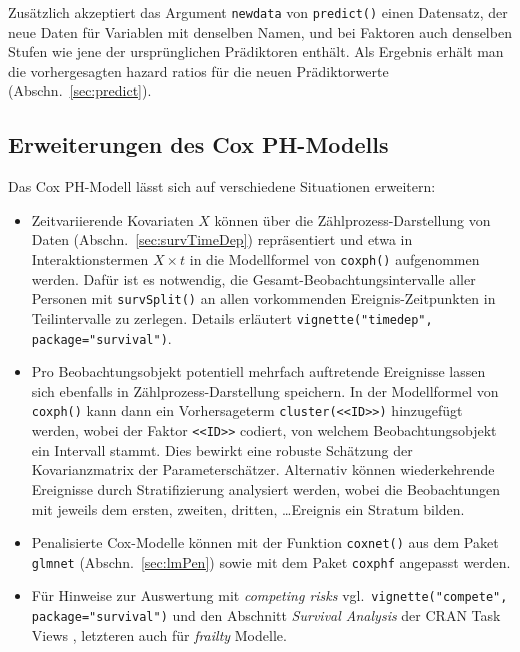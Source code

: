 Zusätzlich akzeptiert das Argument \lstinline!newdata! von \lstinline!predict()! einen Datensatz, der neue Daten für Variablen mit denselben Namen, und bei Faktoren auch denselben Stufen wie jene der ursprünglichen Prädiktoren enthält. Als Ergebnis erhält man die vorhergesagten hazard ratios für die neuen Prädiktorwerte (Abschn.\ \ref{sec:predict}).

\subsection{Erweiterungen des Cox PH-Modells}
\label{sec:coxExtend}

Das Cox PH-Modell lässt sich auf verschiedene Situationen erweitern:

\begin{itemize}
\item Zeitvariierende Kovariaten $X$ können über die Zählprozess-Darstellung von Daten (Abschn.\ \ref{sec:survTimeDep}) repräsentiert und etwa in Interaktionstermen $X \times t$ in die Modellformel von \lstinline!coxph()! aufgenommen werden. Dafür ist es notwendig, die Gesamt-Beobachtungsintervalle aller Personen mit \lstinline!survSplit()! an allen vorkommenden Ereignis-Zeitpunkten in Teilintervalle zu zerlegen. Details erläutert \lstinline!vignette("timedep", package="survival")!.
\item Pro Beobachtungsobjekt potentiell mehrfach auftretende Ereignisse lassen sich ebenfalls in Zählprozess-Darstellung speichern. In der Modellformel von \lstinline!coxph()! kann dann ein Vorhersageterm \lstinline!cluster(<<ID>>)! hinzugefügt werden, wobei der Faktor \lstinline!<<ID>>! codiert, von welchem Beobachtungsobjekt ein Intervall stammt. Dies bewirkt eine robuste Schätzung der Kovarianzmatrix der Parameterschätzer. Alternativ können wiederkehrende Ereignisse durch Stratifizierung analysiert werden, wobei die Beobachtungen mit jeweils dem ersten, zweiten, dritten, \ldots Ereignis ein Stratum bilden.
\item Penalisierte Cox-Modelle können mit der Funktion \lstinline!coxnet()! aus dem Paket \lstinline!glmnet! (Abschn.\ \ref{sec:lmPen}) sowie mit dem Paket  \lstinline!coxphf! \cite{Ploner2013} angepasst werden.
\item Für Hinweise zur Auswertung mit \emph{competing risks} \cite{Beyersmann2012} vgl.\ \lstinline!vignette("compete", package="survival")! und den Abschnitt \emph{Survival Analysis} der CRAN Task Views \cite{CRANtvSurvival}, letzteren auch für \emph{frailty} Modelle.
\end{itemize}

